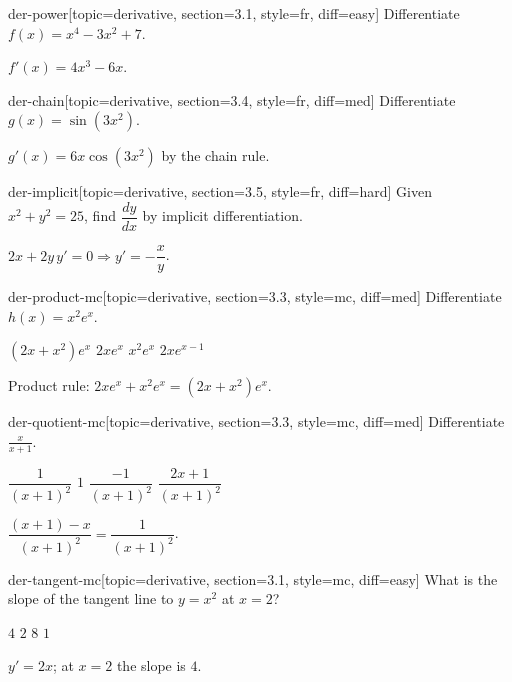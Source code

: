 
\begin{problem}{der-power}[topic=derivative, section=3.1, style=fr, diff=easy]
	Differentiate $f(x) = x^4 - 3x^2 + 7$.
	\begin{solution} $f'(x) = 4x^3 - 6x$. \end{solution}
\end{problem}

\begin{problem}{der-chain}[topic=derivative, section=3.4, style=fr, diff=med]
	Differentiate $g(x) = \sin(3x^2)$.
	\begin{solution} $g'(x) = 6x\cos(3x^2)$ by the chain rule. \end{solution}
\end{problem}

\begin{problem}{der-implicit}[topic=derivative, section=3.5, style=fr, diff=hard]
	Given $x^2 + y^2 = 25$, find $\dfrac{dy}{dx}$ by implicit differentiation.
	\begin{solution} $2x + 2y\,y' = 0 \Rightarrow y' = -\dfrac{x}{y}$. \end{solution}
\end{problem}

\begin{problem}{der-product-mc}[topic=derivative, section=3.3, style=mc, diff=med]
	Differentiate $h(x) = x^2 e^x$.
	\begin{choices}
		\cchoice $(2x + x^2)e^x$
		\choice $2x e^x$
		\choice $x^2 e^x$
		\choice $2x e^{x-1}$
	\end{choices}
	\begin{solution} Product rule: $2x e^x + x^2 e^x = (2x + x^2)e^x$. \end{solution}
\end{problem}

\begin{problem}{der-quotient-mc}[topic=derivative, section=3.3, style=mc, diff=med]
	Differentiate $\displaystyle \frac{x}{x+1}$.
	\begin{choices}
		\cchoice $\dfrac{1}{(x+1)^2}$
		\choice $1$
		\choice $\dfrac{-1}{(x+1)^2}$
		\choice $\dfrac{2x+1}{(x+1)^2}$
	\end{choices}
	\begin{solution} $\dfrac{(x+1) - x}{(x+1)^2} = \dfrac{1}{(x+1)^2}$. \end{solution}
\end{problem}

\begin{problem}{der-tangent-mc}[topic=derivative, section=3.1, style=mc, diff=easy]
	What is the slope of the tangent line to $y = x^2$ at $x = 2$?
	\begin{choices}
		\cchoice $4$
		\choice $2$
		\choice $8$
		\choice $1$
	\end{choices}
	\begin{solution} $y' = 2x$; at $x = 2$ the slope is $4$. \end{solution}
\end{problem}
